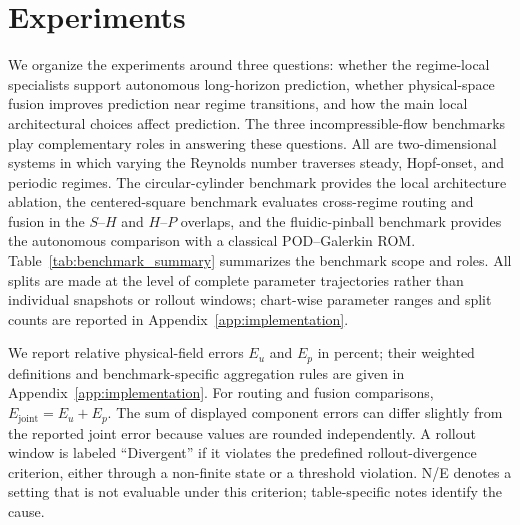 \section{Experiments}
\label{sec:experiments}

We organize the experiments around three questions: whether the regime-local specialists support autonomous long-horizon prediction, whether
physical-space fusion improves prediction near regime transitions, and how the main local architectural choices affect prediction.
The three incompressible-flow benchmarks play complementary roles in answering these questions. All are two-dimensional systems in which varying the Reynolds number traverses steady, Hopf-onset, and periodic regimes. The circular-cylinder benchmark provides the local architecture ablation, the centered-square benchmark evaluates cross-regime routing and fusion in the $S$--$H$ and $H$--$P$ overlaps, and the fluidic-pinball benchmark provides the autonomous comparison with a classical POD--Galerkin ROM. Table~\ref{tab:benchmark_summary} summarizes the benchmark scope and roles. All splits are made at the level of complete parameter trajectories rather than individual snapshots or rollout windows; chart-wise parameter ranges and split counts are reported in Appendix~\ref{app:implementation}.

We report relative physical-field errors $E_u$ and $E_p$ in percent; their weighted definitions and benchmark-specific aggregation rules are given in Appendix~\ref{app:implementation}. For routing and fusion comparisons, $E_{\mathrm{joint}}=E_u+E_p$. The sum of displayed component errors can differ slightly from the reported joint error because values are rounded independently. A rollout window is labeled ``Divergent'' if it violates the predefined rollout-divergence criterion, either through a non-finite state or a
threshold violation. N/E denotes a setting that is not evaluable under this criterion; table-specific notes identify the cause.

